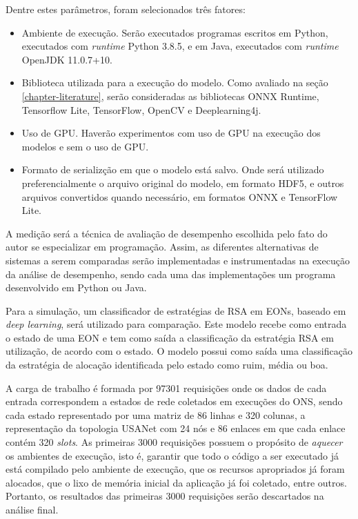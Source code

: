 Dentre estes parâmetros, foram selecionados três fatores:

\begin{itemize}
  \item Ambiente de execução. Serão executados programas escritos em Python, executados com \textit{runtime} Python 3.8.5, e em Java, executados com \textit{runtime} OpenJDK 11.0.7+10.
  \item Biblioteca utilizada para a execução do modelo. Como avaliado na seção \ref{chapter-literature}, serão consideradas as bibliotecas ONNX Runtime, Tensorflow Lite, TensorFlow, OpenCV e Deeplearning4j.
  \item Uso de GPU. Haverão experimentos com uso de GPU na execução dos modelos e sem o uso de GPU.
  \item Formato de serializção em que o modelo está salvo. Onde será utilizado preferencialmente o arquivo original do modelo, em formato HDF5, e outros arquivos convertidos quando necessário, em formatos ONNX e TensorFlow Lite.
\end{itemize}

A medição será a técnica de avaliação de desempenho escolhida pelo fato do autor se especializar em programação. Assim, as diferentes alternativas de sistemas a serem comparadas serão implementadas e instrumentadas na execução da análise de desempenho, sendo cada uma das implementações um programa desenvolvido em Python ou Java.

Para a simulação, um classificador de estratégias de RSA em EONs, baseado em \textit{deep learning}, será utilizado para comparação. Este modelo recebe como entrada o estado de uma EON e tem como saída a classificação da estratégia RSA em utilização, de acordo com o estado. O modelo possui como saída uma classificação da estratégia de alocação identificada pelo estado como ruim, média ou boa.

A carga de trabalho é formada por 97301 requisições onde os dados de cada entrada correspondem a estados de rede coletados em execuções do ONS, sendo cada estado representado por uma matriz de 86 linhas e 320 colunas, a representação da topologia USANet com 24 nós e 86 enlaces em que cada enlace contém 320 \textit{slots}. As primeiras 3000 requisições possuem o propósito de \textit{aquecer} os ambientes de execução, isto é, garantir que todo o código a ser executado já está compilado pelo ambiente de execução, que os recursos apropriados já foram alocados, que o lixo de memória inicial da aplicação já foi coletado, entre outros. Portanto, os resultados das primeiras 3000 requisições serão descartados na análise final.

